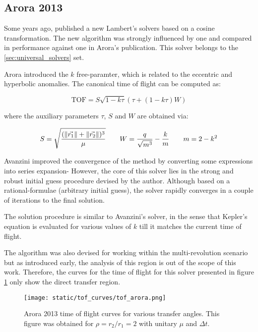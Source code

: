 \subsection{Arora 2013}

Some years ago, \cite{arora2013} published a new Lambert's solvers based on a
cosine transformation. The new algorithm was strongly influenced by
\cite{bate1971} one and compared in performance against \cite{gooding1990} one
in Arora's publication. This solver belongs to the \ref{sec:universal_solvers}
set.

Arora introduced the $k$ free-paramter, which is related to the eccentric and
hyperbolic anomalies. The canonical time of flight can be computed as:

\begin{equation}
  \text{TOF} = S\sqrt{1 - k\tau}(\tau + (1 - k\tau)W)
\end{equation}

where the auxiliary parameters $\tau$, $S$ and $W$ are obtained via:

\begin{equation}
  S = \sqrt{\frac{(\lVert\vec{r_1}\rVert + \lVert\vec{r_2}\rVert)^3}{\mu}}\quad\quad
  W = \frac{q}{\sqrt{m ^3}} - \frac{k}{m}\quad\quad
  m = 2 - k^2
\end{equation}

Avanzini improved the convergence of the method by converting some expressions
into series expansion- However, the core of this solver lies in the strong and
robust initial guess procedure devised by the author. Although based on a
rational-formulae (arbitrary initial guess), the solver rapidly converges in a
couple of iterations to the final solution.

The solution procedure is similar to Avanzini's solver, in the sense that
Kepler's equation is evaluated for various values of $k$ till it matches the
current time of flight.

The algorithm was also devised for working within the multi-revolution scenario
but as introduced early, the analysis of this region is out of the scope of this
work. Therefore, the curves for the time of flight for this solver presented in
figure \ref{fig:tof_arora} only show the direct transfer region.

\vspace{0.5cm}
\begin{figure}[h]
  \centering
  \texttt{[image: static/tof\_curves/tof\_arora.png]}
  \caption[Arora 2013 time of flight curves]{Arora 2013 time of flight curves for various transfer angles. This
    figure was obtained for $\rho=r_2/r_1=2$ with unitary $\mu$ and $\Delta t$.}
  \label{fig:tof_arora}
\end{figure}

